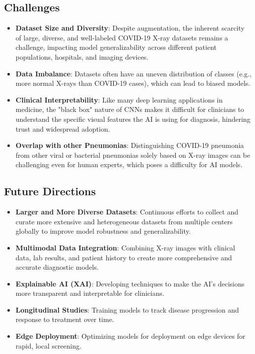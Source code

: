 \subsection*{Challenges}
\begin{itemize}
    \item \textbf{Dataset Size and Diversity}: Despite augmentation, the inherent scarcity of large, diverse, and well-labeled COVID-19 X-ray datasets remains a challenge, impacting model generalizability across different patient populations, hospitals, and imaging devices.
    \item \textbf{Data Imbalance}: Datasets often have an uneven distribution of classes (e.g., more normal X-rays than COVID-19 cases), which can lead to biased models.
    \item \textbf{Clinical Interpretability}: Like many deep learning applications in medicine, the "black box" nature of CNNs makes it difficult for clinicians to understand the specific visual features the AI is using for diagnosis, hindering trust and widespread adoption.
    \item \textbf{Overlap with other Pneumonias}: Distinguishing COVID-19 pneumonia from other viral or bacterial pneumonias solely based on X-ray images can be challenging even for human experts, which poses a difficulty for AI models.
\end{itemize}

\subsection*{Future Directions}
\begin{itemize}
    \item \textbf{Larger and More Diverse Datasets}: Continuous efforts to collect and curate more extensive and heterogeneous datasets from multiple centers globally to improve model robustness and generalizability.
    \item \textbf{Multimodal Data Integration}: Combining X-ray images with clinical data, lab results, and patient history to create more comprehensive and accurate diagnostic models.
    \item \textbf{Explainable AI (XAI)}: Developing techniques to make the AI's decisions more transparent and interpretable for clinicians.
    \item \textbf{Longitudinal Studies}: Training models to track disease progression and response to treatment over time.
    \item \textbf{Edge Deployment}: Optimizing models for deployment on edge devices for rapid, local screening.
\end{itemize}

